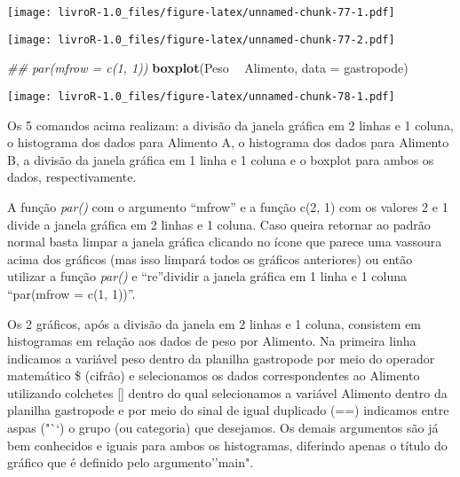 \documentclass[]{book}
\newenvironment{Shaded}{\begin{snugshade}}{\end{snugshade}}
\newcommand{\CommentTok}[1]{\textcolor[rgb]{0.56,0.35,0.01}{\textit{#1}}}
\newcommand{\DataTypeTok}[1]{\textcolor[rgb]{0.13,0.29,0.53}{#1}}
\newcommand{\KeywordTok}[1]{\textcolor[rgb]{0.13,0.29,0.53}{\textbf{#1}}}
\newcommand{\NormalTok}[1]{#1}
\newcommand{\OperatorTok}[1]{\textcolor[rgb]{0.81,0.36,0.00}{\textbf{#1}}}
\newcommand{\StringTok}[1]{\textcolor[rgb]{0.31,0.60,0.02}{#1}}
\begin{document}
\texttt{[image: livroR-1.0\_files/figure-latex/unnamed-chunk-77-1.pdf]}

\begin{Shaded}
\end{Shaded}

\texttt{[image: livroR-1.0\_files/figure-latex/unnamed-chunk-77-2.pdf]}

\begin{Shaded}
\begin{Highlighting}[]
\CommentTok{## par(mfrow = c(1, 1))}
\KeywordTok{boxplot}\NormalTok{(Peso }\OperatorTok{~}\StringTok{ }\NormalTok{Alimento, }\DataTypeTok{data =}\NormalTok{ gastropode)}
\end{Highlighting}
\end{Shaded}

\texttt{[image: livroR-1.0\_files/figure-latex/unnamed-chunk-78-1.pdf]}

Os 5 comandos acima realizam: a divisão da janela gráfica em 2 linhas e 1 coluna, o histograma dos dados para Alimento A, o histograma dos dados para Alimento B, a divisão da janela gráfica em 1 linha e 1 coluna e o boxplot para ambos os dados, respectivamente.

A função \emph{par()} com o argumento ``mfrow'' e a função c(2, 1) com os valores 2 e 1 divide a janela gráfica em 2 linhas e 1 coluna. Caso queira retornar ao padrão normal basta limpar a janela gráfica clicando no ícone que parece uma vassoura acima dos gráficos (mas isso limpará todos os gráficos anteriores) ou então utilizar a função \emph{par()} e ``re''dividir a janela gráfica em 1 linha e 1 coluna ``par(mfrow = c(1, 1))''.

Os 2 gráficos, após a divisão da janela em 2 linhas e 1 coluna, consistem em histogramas em relação aos dados de peso por Alimento. Na primeira linha indicamos a variável peso dentro da planilha gastropode por meio do operador matemático \$ (cifrão) e selecionamos os dados correspondentes ao Alimento utilizando colchetes {[}{]} dentro do qual selecionamos a variável Alimento dentro da planilha gastropode e por meio do sinal de igual duplicado (==) indicamos entre aspas ("``) o grupo (ou categoria) que desejamos. Os demais argumentos são já bem conhecidos e iguais para ambos os histogramas, diferindo apenas o título do gráfico que é definido pelo argumento''main".
\end{document}
